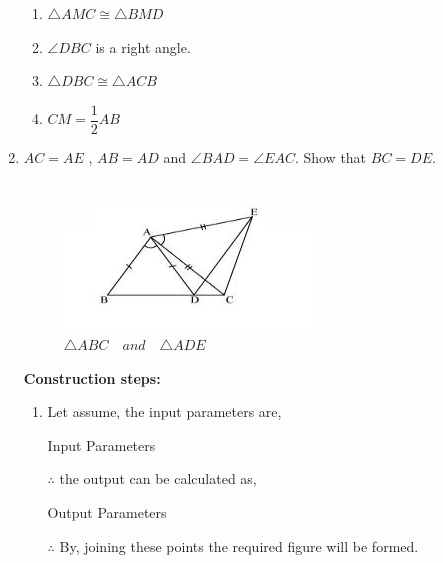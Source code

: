 \begin{enumerate}[label=\thesection.\arabic*,ref=\thesection.\theenumi]
\begin{enumerate}
\item $\triangle AMC \cong \triangle BMD$
\item $\angle DBC$ is a right angle.
\item $\triangle DBC \cong \triangle ACB$
\item $CM = \dfrac{1}{2}AB$
\end{enumerate}
\label{chapters/9/7/1/8}

\item $AC = AE$ , $AB = AD$ and $\angle BAD = \angle EAC$. Show that $BC = DE$.
\begin{figure}[H]
    \includegraphics[width=\columnwidth]{figs/ABCDE.png}
	\caption{$\triangle ABC \hspace{12pt} and \hspace{12pt} \triangle ADE $}
 \label{fig:Sample triangle}
\end{figure}
\textbf{Construction steps:}
\\
		\begin{enumerate}[label=(\roman*)]
\item Let assume, the input parameters are, 
\begin{table}[H]
\centering
	
	  \caption{Input Parameters}
	  \label{Input parameter table }
\end{table}
$\therefore$ the output can be calculated as,
\begin{table}[H]
\centering
	
	  \caption{Output Parameters}
	  \label{Output parameter table}
\end{table}
$\therefore$ By, joining these points the required figure will be formed.
\end{enumerate}
\begin{figure}[H]

\end{figure}
\end{enumerate}

